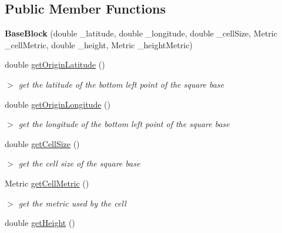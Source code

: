 \subsection*{\-Public \-Member \-Functions}
\begin{DoxyCompactItemize}
\item 
\hypertarget{classBaseBlock_ab39d132d09fcf4cd751e5953c3e989fc}{{\bfseries \-Base\-Block} (double \-\_\-latitude, double \-\_\-longitude, double \-\_\-cell\-Size, \-Metric \-\_\-cell\-Metric, double \-\_\-height, \-Metric \-\_\-height\-Metric)}\label{classBaseBlock_ab39d132d09fcf4cd751e5953c3e989fc}

\item 
\hypertarget{classBaseBlock_ac431ecb88fd5aa65752c9f573f895571}{double \hyperlink{classBaseBlock_ac431ecb88fd5aa65752c9f573f895571}{get\-Origin\-Latitude} ()}\label{classBaseBlock_ac431ecb88fd5aa65752c9f573f895571}

\begin{DoxyCompactList}\small\item\em $>$ get the latitude of the bottom left point of the square base \end{DoxyCompactList}\item 
\hypertarget{classBaseBlock_a7cb31127064ea83fb803189df10a4eb6}{double \hyperlink{classBaseBlock_a7cb31127064ea83fb803189df10a4eb6}{get\-Origin\-Longitude} ()}\label{classBaseBlock_a7cb31127064ea83fb803189df10a4eb6}

\begin{DoxyCompactList}\small\item\em $>$ get the longitude of the bottom left point of the square base \end{DoxyCompactList}\item 
\hypertarget{classBaseBlock_a18ec021a3eb8e3c2bc157d64f87164df}{double \hyperlink{classBaseBlock_a18ec021a3eb8e3c2bc157d64f87164df}{get\-Cell\-Size} ()}\label{classBaseBlock_a18ec021a3eb8e3c2bc157d64f87164df}

\begin{DoxyCompactList}\small\item\em $>$ get the cell size of the square base \end{DoxyCompactList}\item 
\hypertarget{classBaseBlock_ae262558c4bb287e1ce4f73705629c454}{\-Metric \hyperlink{classBaseBlock_ae262558c4bb287e1ce4f73705629c454}{get\-Cell\-Metric} ()}\label{classBaseBlock_ae262558c4bb287e1ce4f73705629c454}

\begin{DoxyCompactList}\small\item\em $>$ get the metric used by the cell \end{DoxyCompactList}\item 
\hypertarget{classBaseBlock_a56868b9cbad44abeebb135f6f354232d}{double \hyperlink{classBaseBlock_a56868b9cbad44abeebb135f6f354232d}{get\-Height} ()}\label{classBaseBlock_a56868b9cbad44abeebb135f6f354232d}


\end{DoxyCompactItemize}
